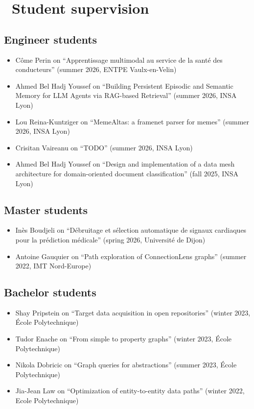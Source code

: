 \documentclass{article}
\begin{document}
\section*{\faCommentsO\ Student supervision}
\subsection*{Engineer students}
\begin{itemize}
\item Côme Perin on ``Apprentissage multimodal au service de la santé des conducteurs'' (summer 2026, ENTPE Vaulx-en-Velin)
\item Ahmed Bel Hadj Youssef on ``Building Persistent Episodic and Semantic Memory for LLM Agents via RAG-based Retrieval'' (summer 2026, INSA Lyon)
\item Lou Reina-Kuntziger on ``MemeAltas: a framenet parser for memes'' (summer 2026, INSA Lyon)
\item Crisitan Vaireanu on ``TODO'' (summer 2026, INSA Lyon)
\item Ahmed Bel Hadj Youssef on ``Design and implementation of a data mesh architecture for domain-oriented document classification'' (fall 2025, INSA Lyon)
\end{itemize}
\subsection*{Master students}
\begin{itemize}
\item Inès Boudjeli on ``Débruitage et sélection automatique de signaux cardiaques pour la prédiction médicale'' (spring 2026, Université de Dijon)
\item Antoine Gauquier on ``Path exploration of ConnectionLens graphs'' (summer 2022, IMT Nord-Europe)
\end{itemize}
\subsection*{Bachelor students}
\begin{itemize}
\item Shay Pripstein on ``Target data acquisition in open repositories'' (winter 2023, École Polytechnique)
\item Tudor Enache on ``From simple to property graphs'' (winter 2023, École Polytechnique)
\item Nikola Dobricic on ``Graph queries for abstractions'' (summer 2023, École Polytechnique)
\item Jia-Jean Law on ``Optimization of entity-to-entity data paths'' (winter 2022, Ecole Polytechnique)
\end{itemize}
\end{document}
